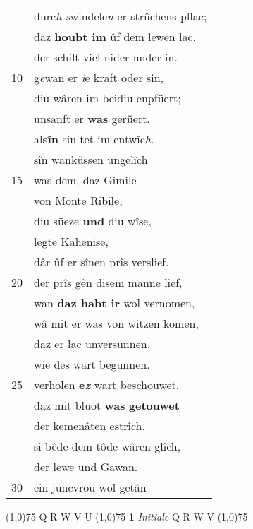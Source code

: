 \documentclass[8pt,a4paper,notitlepage]{article}
\begin{document}
\begin{table}[ht]
\begin{minipage}[t]{0.5\linewidth}
\begin{tabular}{rl}
 & durc\textit{h s}windele\textit{n} er strûchens pflac;\\ 
 & daz \textbf{houbt im} ûf dem lewen lac.\\ 
 & der schilt viel nider under in.\\ 
10 & g\textit{e}wan er \textit{i}e kraft oder sin,\\ 
 & diu wâren im beidiu enpfüert;\\ 
 & unsanft er \textbf{was} gerüert.\\ 
 & al\textbf{sîn} sin tet im entwîc\textit{h}.\\ 
 & sîn wanküssen ungelîch\\ 
15 & was dem, daz Gimile\\ 
 & von Monte Ribile,\\ 
 & diu süeze \textbf{und} diu wîse,\\ 
 & legte Kahenise,\\ 
 & dâr ûf er sînen prîs verslief.\\ 
20 & der prîs gên disem manne lief,\\ 
 & wan \textbf{daz habt ir} wol vernomen,\\ 
 & wâ mit er was von witzen komen,\\ 
 & daz er lac unversunnen,\\ 
 & wie des wart begunnen.\\ 
25 & verholen \textbf{e\textit{z}} wart beschouwet,\\ 
 & daz mit bluot \textbf{was} \textbf{getouwet}\\ 
 & der kemenâten estrîch.\\ 
 & si bêde dem tôde wâren glîch,\\ 
 & der lewe und Gawan.\\ 
30 & ein juncvrou wol getân\\ 
\end{tabular}
\scriptsize
\line(1,0){75} \newline
Q R W V U \newline
\line(1,0){75} \newline
\textbf{1} \textit{Initiale} Q R W V  \newline
\line(1,0){75} \newline

\end{minipage}
\end{table}
\end{document}
